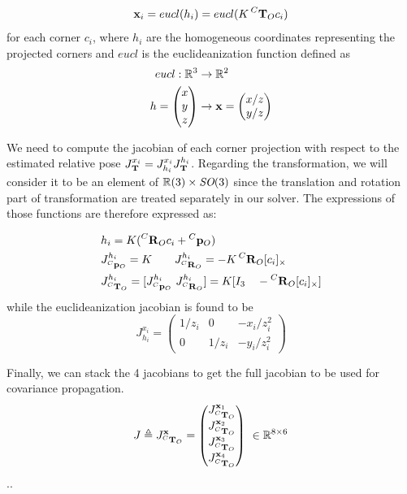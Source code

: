 \begin{equation}
    {\bf x}_i = eucl(h_i) = eucl(K\prescript{C}{}{{\bf T}}_{O} c_i)
\end{equation}
for each corner $c_i$, where $h_i$ are the homogeneous coordinates representing the projected corners and $eucl$ is the euclideanization function defined as
\begin{equation}
    \begin{split}
        eucl: \mathbb{R}^3 &\rightarrow \mathbb{R}^2 \\
        h = \begin{pmatrix}x\\y\\z\end{pmatrix} &\rightarrow {\bf x} = \begin{pmatrix}x/z\\y/z\end{pmatrix}
    \end{split}
\end{equation}

We need to compute the jacobian of each corner projection with respect to the estimated relative pose $J^{x_i}_{\prescript{}{}{{\bf T}}_{}} = J^{x_i}_{h_i} J^{h_i}_{\prescript{}{}{{\bf T}}_{}}$. 
Regarding the transformation, we will consider it to be an element of $\mathbb{R}(3)\times \textit{SO}(3)$ since the translation and rotation part 
of transformation are treated separately in our solver. The expressions of those functions are therefore expressed as:

\begin{equation}
    \begin{split}
        &h_i = K(\prescript{C}{}{{\bf R}}_{O}c_i + \prescript{C}{}{{\bf p}}_{O}) \\
        &J^{h_i}_{\prescript{C}{}{{\bf p}}_{O}} = K ~~~~~~ J^{h_i}_{\prescript{C}{}{{\bf R}}_{O}} = -K\prescript{C}{}{{\bf R}}_{O}[c_i]_{\times}  \\  
        &J^{h_i}_{\prescript{C}{}{{\bf T}}_{O}} = [J^{h_i}_{\prescript{C}{}{{\bf p}}_{O}} ~J^{h_i}_{\prescript{C}{}{{\bf R}}_{O}}] = K [I_3 ~~~ -\prescript{C}{}{{\bf R}}_{O} [c_i]_{\times}]
    \end{split}
\end{equation}
while the euclideanization jacobian is found to be
\begin{equation}
    J^{x_i}_{h_i}
    =
    \begin{pmatrix}
    1/z_i & 0 & -x_i/z_i^2 \\
    0 & 1/z_i & -y_i/z_i^2
    \end{pmatrix}
\end{equation}


Finally, we can stack the 4 jacobians to get the full jacobian to be used for covariance propagation.
\begin{equation}
    J \triangleq J^{{\bf x}}_{\prescript{C}{}{{\bf T}}_{O}}=
    \begin{pmatrix}
    J^{{\bf x}_1}_{\prescript{C}{}{{\bf T}}_{O}} \\ J^{{\bf x}_2}_{\prescript{C}{}{{\bf T}}_{O}} \\ J^{{\bf x}_3}_{\prescript{C}{}{{\bf T}}_{O}} \\ J^{{\bf x}_4}_{\prescript{C}{}{{\bf T}}_{O}}
    \end{pmatrix}
    ~ \in \mathbb{R}^{8 \times 6}
\end{equation}.. 


